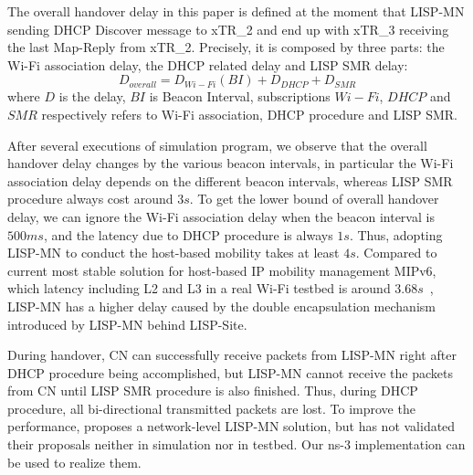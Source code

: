 The overall handover delay in this paper is defined at the moment that LISP-MN sending DHCP Discover message to xTR\_2 and end up with xTR\_3 receiving the last Map-Reply from xTR\_2. Precisely, it is composed by three parts: the Wi-Fi association delay, the DHCP related delay and LISP SMR delay:
\begin{equation}
	D_{overall} = D_{Wi-Fi}(BI) + D_{DHCP} + D_{SMR} \nonumber
\end{equation}
where $D$ is the delay, $BI$ is Beacon Interval, subscriptions $Wi-Fi$, $DHCP$ and $SMR$ respectively refers to Wi-Fi association, DHCP procedure and LISP SMR. 

After several executions of simulation program, we observe that the overall handover delay changes by the various beacon intervals, in particular the Wi-Fi association delay depends on the different beacon intervals, whereas LISP SMR procedure always cost around $3s$. To get the lower bound of overall handover delay, we can ignore the Wi-Fi association delay when the beacon interval is $500ms$, and the latency due to DHCP procedure is always $1s$. Thus, adopting LISP-MN to conduct the host-based mobility takes at least $4s$. Compared to current most stable solution for host-based IP mobility management MIPv6, which latency including L2 and L3 in a real Wi-Fi testbed is around $3.68s$~\cite{vassiliou2010analysis}, LISP-MN has a higher delay caused by the double encapsulation mechanism introduced by LISP-MN behind LISP-Site. 

During handover, CN can successfully receive packets from LISP-MN right after DHCP procedure being accomplished, but LISP-MN cannot receive the packets from CN until LISP SMR procedure is also finished. Thus, during DHCP procedure, all bi-directional transmitted packets are lost. To improve the performance, \cite{tang2017lisp} proposes a network-level LISP-MN solution, but has not validated their proposals neither in simulation nor in testbed. Our ns-3 implementation can be used to realize them.




